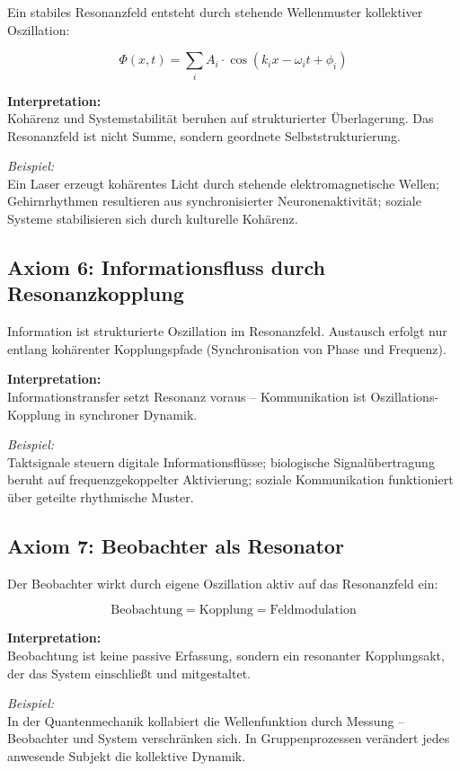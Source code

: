 \documentclass[12pt]{iopart}
\providecommand{\text}[1]{\mbox{#1}}
\begin{document}
Ein stabiles Resonanzfeld entsteht durch stehende Wellenmuster kollektiver Oszillation:

$$
\Phi(x, t) = \sum_{i} A_i \cdot \cos(k_i x - \omega_i t + \phi_i)
$$

\textbf{Interpretation:}\\
Kohärenz und Systemstabilität beruhen auf strukturierter Überlagerung. Das Resonanzfeld ist nicht Summe, sondern geordnete Selbststrukturierung.

\textit{Beispiel:}\\
Ein Laser erzeugt kohärentes Licht durch stehende elektromagnetische Wellen; Gehirnrhythmen resultieren aus synchronisierter Neuronenaktivität; soziale Systeme stabilisieren sich durch kulturelle Kohärenz.

\subsection{Axiom 6: Informationsfluss durch Resonanzkopplung}

Information ist strukturierte Oszillation im Resonanzfeld. Austausch erfolgt nur entlang kohärenter Kopplungspfade (Synchronisation von Phase und Frequenz).

\textbf{Interpretation:}\\
Informationstransfer setzt Resonanz voraus – Kommunikation ist Oszillations-Kopplung in synchroner Dynamik.

\textit{Beispiel:}\\
Taktsignale steuern digitale Informationsflüsse; biologische Signalübertragung beruht auf frequenzgekoppelter Aktivierung; soziale Kommunikation funktioniert über geteilte rhythmische Muster.

\subsection{Axiom 7: Beobachter als Resonator}

Der Beobachter wirkt durch eigene Oszillation aktiv auf das Resonanzfeld ein:

$$
\text{Beobachtung} = \text{Kopplung} = \text{Feldmodulation}
$$

\textbf{Interpretation:}\\
Beobachtung ist keine passive Erfassung, sondern ein resonanter Kopplungsakt, der das System einschließt und mitgestaltet.

\textit{Beispiel:}\\
In der Quantenmechanik kollabiert die Wellenfunktion durch Messung – Beobachter und System verschränken sich. In Gruppenprozessen verändert jedes anwesende Subjekt die kollektive Dynamik.
\end{document}
